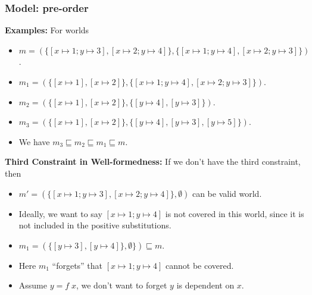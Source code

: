 \begin{frame}[fragile]
    \frametitle{Model: pre-order}

\textbf{Examples:} For worlds 
    \begin{itemize}
        \item $m = (\{[x\mapsto 1;y\mapsto 3], [x\mapsto 2;y\mapsto 4]\}, \{[x\mapsto 1;y\mapsto 4], [x\mapsto 2;y\mapsto 3]\})$.
        \item $m_1 = (\{[x\mapsto 1], [x\mapsto 2]\}, \{[x\mapsto 1;y\mapsto 4], [x\mapsto 2;y\mapsto 3]\})$.
        \item $m_2 = (\{[x\mapsto 1], [x\mapsto 2]\}, \{[y\mapsto 4], [y\mapsto 3]\})$.
        \item $m_3 = (\{[x\mapsto 1], [x\mapsto 2]\}, \{[y\mapsto 4], [y\mapsto 3], [y\mapsto 5]\})$.
        \item We have $m_3 \sqsubseteq m_2 \sqsubseteq m_1 \sqsubseteq m$.
\end{itemize}

\textbf{Third Constraint in Well-formedness:} If we don't have the third constraint, then
\begin{itemize}
    \item $m' = (\{[x\mapsto 1;y\mapsto 3], [x\mapsto 2;y\mapsto 4]\}, \emptyset)$ can be valid world.
    \item Ideally, we want to say $[x\mapsto 1;y\mapsto 4]$ is not covered in this world, since it is not included in the positive substitutions.
    \item $m_1 = (\{[y\mapsto 3], [y\mapsto 4]\}, \emptyset\}) \sqsubseteq m$.
    \item Here $m_1$ ``forgets'' that $[x\mapsto 1;y\mapsto 4]$ cannot be covered.
    \item Assume $y = f\;x$, we don't want to forget $y$ is dependent on $x$.
\end{itemize}

\end{frame}

